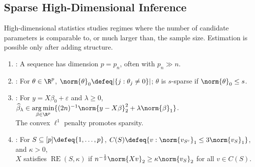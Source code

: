 \subsection{Sparse High-Dimensional Inference}

High-dimensional statistics studies regimes where the number of candidate parameters is comparable to, or much larger than, the sample size.  Estimation is possible only after adding structure.

\begin{definition} \label{def:sparse-vector-and-high-dimensional-regime} \label{def:lasso-estimator} \label{def:restricted-eigenvalue-condition} 
\begin{enumerate}[label=(\roman*)]
\setlength{\itemsep}{0pt}
\item {}: A sequence has dimension $p=p_n$, often with $p_n\gg n$.
\item {}: For $\theta\in\R^p$, $\norm{\theta}_0\defeq|\{j:\theta_j\neq0\}|$; $\theta$ is $s$-sparse if $\norm{\theta}_0\leq s$.
\item {}: For $y=X\beta_0+\varepsilon$ and $\lambda\geq0$, $\widehat{\beta}_\lambda\in\operatorname*{arg\,min}\limits_{\beta\in\R^p}\{(2n)^{-1}\norm{y-X\beta}_2^2+\lambda\norm{\beta}_1\}$.\\
The convex $\ell^1$ penalty promotes sparsity.
\item {}: For $S\subseteq[p]\defeq\{1,\ldots,p\}$, $C(S)\defeq\{v:\norm{v_{S^c}}_1\leq3\norm{v_S}_1\}$, and $\kappa>0$,\\
$X$ satisfies $\operatorname{RE}(S,\kappa)$ if $n^{-\frac{1}{2}}\norm{Xv}_2\geq\kappa\norm{v_S}_2$ for all $v\in C(S)$.
\end{enumerate}
\end{definition}

